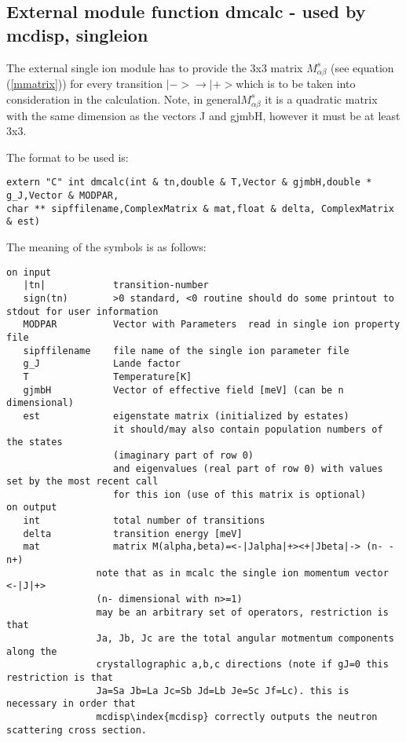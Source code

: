 \subsection{External module function {\prg dmcalc} - used by {\prg mcdisp},{\prg %
singleion}}

The external single ion module has to provide the 3x3 
matrix $M^s_{\alpha\beta}$ (see equation (\ref{mmatrix})) for every transition
$|-> \rightarrow |+>$which is to be taken into consideration 
in the calculation. Note, in general$M^s_{\alpha\beta}$ it is a quadratic matrix with the same
dimension as the vectors J and gjmbH, however it must be at least 3x3.


The format to be used is:
{\footnotesize
\begin{verbatim}
extern "C" int dmcalc(int & tn,double & T,Vector & gjmbH,double * g_J,Vector & MODPAR,
char ** sipffilename,ComplexMatrix & mat,float & delta, ComplexMatrix & est)
\end{verbatim}

The meaning of the symbols is as follows:

\begin{verbatim}
on input
   |tn|            transition-number  
   sign(tn)        >0 standard, <0 routine should do some printout to stdout for user information
   MODPAR          Vector with Parameters  read in single ion property file
   sipffilename    file name of the single ion parameter file
   g_J             Lande factor
   T               Temperature[K]
   gjmbH           Vector of effective field [meV] (can be n dimensional)
   est             eigenstate matrix (initialized by estates)
                   it should/may also contain population numbers of the states
				   (imaginary part of row 0)
                   and eigenvalues (real part of row 0) with values set by the most recent call
				   for this ion (use of this matrix is optional)
on output
   int             total number of transitions
   delta           transition energy [meV]
   mat             matrix M(alpha,beta)=<-|Jalpha|+><+|Jbeta|-> (n- - n+)
                note that as in mcalc the single ion momentum vector <-|J|+> 
				(n- dimensional with n>=1)
                may be an arbitrary set of operators, restriction is that 
                Ja, Jb, Jc are the total angular motmentum components along the
                crystallographic a,b,c directions (note if gJ=0 this restriction is that
                Ja=Sa Jb=La Jc=Sb Jd=Lb Je=Sc Jf=Lc). this is necessary in order that
                mcdisp\index{mcdisp} correctly outputs the neutron scattering cross section.
				
\end{verbatim}
}
